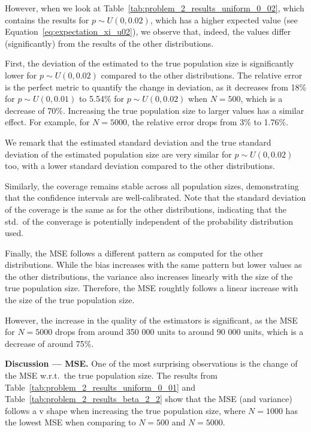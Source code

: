 However, when we look at Table~\ref{tab:problem_2_results_uniform_0_02}, which contains the results for $p\sim U(0, 0.02)$, which has a higher expected value (see Equation~\ref{eq:expectation_xi_u02}), we observe that, indeed, the values differ (significantly) from the results of the other distributions.

First, the deviation of the estimated to the true population size is significantly lower for $p\sim U(0, 0.02)$ compared to the other distributions. 
The relative error is the perfect metric to quantify the change in deviation, as it decreases from 18\% for $p\sim U(0, 0.01)$ to 5.54\% for $p\sim U(0, 0.02)$ when $N=500$, which is a decrease of $70\%$. Increasing the true population size to larger values has a similar effect. For example, for $N=5000$, the relative error drops from 3\% to 1.76\%.

We remark that the estimated standard deviation and the true standard deviation of the estimated population size are very similar for $p\sim U(0, 0.02)$ too, with a lower standard deviation compared to the other distributions.

Similarly, the coverage remains stable across all population sizes, demonstrating that the confidence intervals are well-calibrated. Note that the standard deviation of the coverage is the same as for the other distributions, indicating that the std.\ of the converage is potentially independent of the probability distribution used.

Finally, the MSE follows a different pattern as computed for the other distributions.
While the bias increases with the same pattern but lower values as the other distributions, the variance also increases linearly with the size of the true population size. 
Therefore, the MSE roughtly follows a linear increase with the size of the true population size.

However, the increase in the quality of the estimators is significant, as the MSE for $N=5000$ drops from around 350 000 units to around 90 000 units, which is a decrease of around 75\%.


\textbf{Discussion --- MSE.}
One of the most surprising observations is the change of the MSE w.r.t.\ the true population size. The results from Table~\ref{tab:problem_2_results_uniform_0_01} and Table~\ref{tab:problem_2_results_beta_2_2} show that the MSE (and variance) follows a v shape when increasing the true population size, where $N=1000$ has the lowest MSE when comparing to $N=500$ and $N=5000$.

